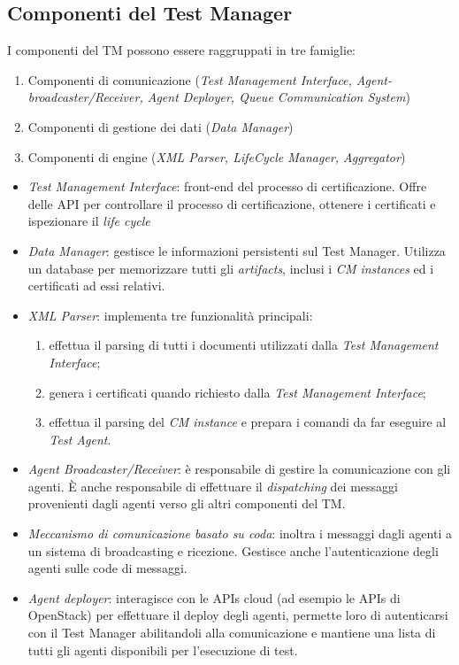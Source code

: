 \documentclass[../main.tex]{subfiles}
\begin{document}
\subsection{Componenti del Test Manager}
I componenti del TM possono essere raggruppati in tre famiglie:
\begin{enumerate}
\item Componenti di comunicazione (\textit{Test Management Interface, Agent-broadcaster/Receiver, Agent Deployer, Queue Communication System})
\item Componenti di gestione dei dati (\textit{Data Manager})
\item Componenti di engine (\textit{XML Parser, LifeCycle Manager, Aggregator})
\end{enumerate}
\begin{itemize}
\item \textit{Test Management Interface}: front-end del processo di certificazione. Offre delle API per controllare il processo di certificazione, ottenere i certificati e ispezionare il \textit{life cycle}
\item \textit{Data Manager}: gestisce le informazioni persistenti sul Test Manager. Utilizza un database per memorizzare tutti gli \textit{artifacts}, inclusi i \textit{CM instances} ed i certificati ad essi relativi.
\item \textit{XML Parser}: implementa tre funzionalità principali:
\begin{enumerate}
\item effettua il parsing di tutti i documenti utilizzati dalla \textit{Test Management Interface};
\item genera i certificati quando richiesto dalla \textit{Test Management Interface};
\item effettua il parsing del \textit{CM instance} e prepara i comandi da far eseguire al \textit{Test Agent}.
\end{enumerate}
\item \textit{Agent Broadcaster/Receiver}: è responsabile di gestire la comunicazione con gli agenti. \`E anche responsabile di effettuare il \textit{dispatching} dei messaggi provenienti dagli agenti verso gli altri componenti del TM. 
\item \textit{Meccanismo di comunicazione basato su coda}: inoltra i messaggi dagli agenti a un sistema di broadcasting e ricezione. Gestisce anche l'autenticazione degli agenti sulle code di messaggi.
\item \textit{Agent deployer}: interagisce con le APIs cloud (ad esempio le APIs di OpenStack) per effettuare il deploy degli agenti, permette loro di autenticarsi con il Test Manager abilitandoli alla comunicazione e mantiene una lista di tutti gli agenti disponibili per l'esecuzione di test.

\end{itemize}
\end{document}
